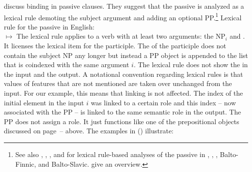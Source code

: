 \documentclass[output=paper
 	        ,biblatex
                ,babelshorthands
                ,newtxmath
                ,draftmode
                ,colorlinks, citecolor=brown
]{langscibook}
\begin{document}

\citet{MS98a} discuss binding in passive clauses. They suggest that the passive is analyzed as a
lexical rule demoting the subject argument and adding an optional PP.\footnote{
  See also , , , and  for lexical rule-based analyses of the
  passive in 
, , , Balto-Finnic, and Balto-Slavic.  give an overview.
} 
\ea
Lexical rule for the passive in English:\\
$\mapsto$
\z
The lexical rule applies to a verb with at least two arguments: the NP$_i$ and . It licenses
the lexical item for the participle. The \argstl of the participle does not contain the subject NP
any longer but instead a PP object is appended to the list that is coindexed with the same argument $i$. 
The lexical rule does not show the \contv in the input and the output. A notational convention
regarding lexical rules is that values of features that are not mentioned are taken over unchanged
from the input. For our example, this means that linking is not affected. The index of the initial
element in the input $i$ was linked to a certain role and this index -- now associated with the PP
-- is linked to the same semantic role in the output. The PP does not assign a role. It just
functions like one of the prepositional objects discussed on
page~\pageref{binding:page-prepositional-objects-start}--\pageref{binding:page-prepositional-objects-end}
above. The examples in () illustrate:
\end{document}
